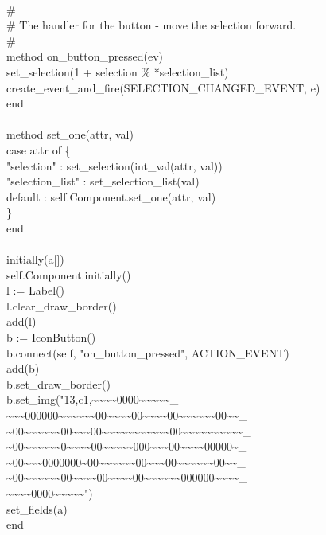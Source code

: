 {\ \\
\>\# \\
\>\# The handler for the button - move the selection forward. \\
\>\# \\
\>method on\_button\_pressed(ev) \\
\>\>set\_selection(1 + selection \% *selection\_list) \\
\>\>create\_event\_and\_fire(SELECTION\_CHANGED\_EVENT, e) \\
\>end \\
\ \\
\>method set\_one(attr, val) \\
\>\>case attr of \{ \\
\>\>\>"selection" : set\_selection(int\_val(attr, val)) \\
\>\>\>"selection\_list" : set\_selection\_list(val) \\
\>\>\>default : self.Component.set\_one(attr, val) \\
\>\>\} \\
\>end \\
\ \\
\>initially(a[])  \\
\>\>self.Component.initially() \\
\>\>l := Label() \\
\>\>l.clear\_draw\_border() \\
\>\>add(l) \\
\>\>b := IconButton() \\
\>\>b.connect(self, "on\_button\_pressed", ACTION\_EVENT) \\
\>\>add(b) \\
\>\>b.set\_draw\_border() \\
\>\>b.set\_img("13,c1,\~{}\~{}\~{}\~{}0000\~{}\~{}\~{}\~{}\~{}\_ \\
\>\>\~{}\~{}\~{}000000\~{}\~{}\~{}\~{}\~{}\~{}00\~{}\~{}\~{}\~{}00\~{}\~{}\~{}\~{}00\~{}\~{}\~{}\~{}\~{}\~{}00\~{}\~{}\_ \\
\>\>\~{}00\~{}\~{}\~{}\~{}\~{}\~{}00\~{}\~{}\~{}00\~{}\~{}\~{}\~{}\~{}\~{}\~{}\~{}\~{}\~{}\~{}00\~{}\~{}\~{}\~{}\~{}\~{}\~{}\~{}\~{}\~{}\_ \\
\>\>\~{}00\~{}\~{}\~{}\~{}\~{}\~{}0\~{}\~{}\~{}\~{}00\~{}\~{}\~{}\~{}\~{}000\~{}\~{}\~{}00\~{}\~{}\~{}\~{}00000\~{}\_ \\
\>\>\~{}00\~{}\~{}\~{}0000000\~{}00\~{}\~{}\~{}\~{}\~{}\~{}00\~{}\~{}\~{}00\~{}\~{}\~{}\~{}\~{}\~{}00\~{}\~{}\_ \\
\>\>\~{}00\~{}\~{}\~{}\~{}\~{}\~{}00\~{}\~{}\~{}\~{}00\~{}\~{}\~{}\~{}00\~{}\~{}\~{}\~{}\~{}\~{}000000\~{}\~{}\~{}\~{}\_ \\
\>\>\~{}\~{}\~{}\~{}0000\~{}\~{}\~{}\~{}\~{}") \\
\>\>set\_fields(a) \\
end
}

